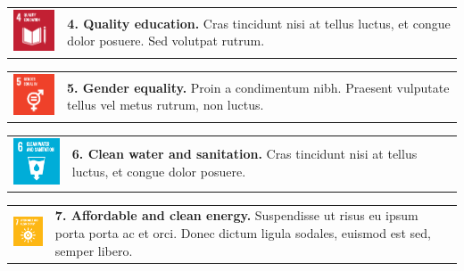 \begin{multicols}{2}
    \noindent
    \begin{tabular}{p{25mm} p{46mm}}
        \vspace{0mm} \includegraphics[width=2cm]{text/appendix/appendix-sdg/resources/sdg4.pdf} & \vspace{-0.5mm} \textbf{4. Quality education.} Cras tincidunt nisi at tellus luctus, et congue dolor posuere. Sed volutpat rutrum.  \\
    \end{tabular}

    \noindent
    \begin{tabular}{p{25mm} p{46mm}}
        \vspace{0mm} \includegraphics[width=2cm]{text/appendix/appendix-sdg/resources/sdg5.pdf} & \vspace{-0.5mm} \textbf{5. Gender equality.} Proin a condimentum nibh. Praesent vulputate tellus vel metus rutrum, non luctus.  \\
    \end{tabular}

    \noindent
    \begin{tabular}{p{25mm} p{46mm}}
        \vspace{0mm} \includegraphics[width=2cm]{text/appendix/appendix-sdg/resources/sdg6.pdf} & \vspace{-0.5mm} \textbf{6. Clean water and sanitation.} Cras tincidunt nisi at tellus luctus, et congue dolor posuere.\\
    \end{tabular}

    \noindent
    \begin{tabular}{p{25mm} p{46mm}}
        \vspace{0mm} \includegraphics[width=2cm]{text/appendix/appendix-sdg/resources/sdg7.pdf} & \vspace{-0.5mm} \textbf{7. Affordable and clean energy.} Suspendisse ut risus eu ipsum porta porta ac et orci. Donec dictum ligula sodales, euismod est sed, semper libero.  \\
    \end{tabular}


\end{multicols}
